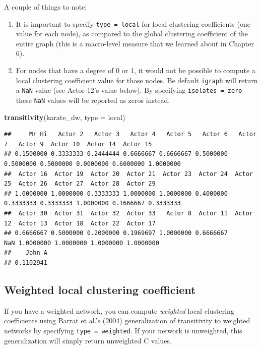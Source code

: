 \documentclass[
]{book}
\newenvironment{Shaded}{\begin{snugshade}}{\end{snugshade}}
\newcommand{\AttributeTok}[1]{\textcolor[rgb]{0.13,0.29,0.53}{#1}}
\newcommand{\FunctionTok}[1]{\textcolor[rgb]{0.13,0.29,0.53}{\textbf{#1}}}
\newcommand{\NormalTok}[1]{#1}
\newcommand{\StringTok}[1]{\textcolor[rgb]{0.31,0.60,0.02}{#1}}
\begin{document}
A couple of things to note:

\begin{enumerate}
\def\labelenumi{\arabic{enumi}.}
\item
  It is important to specify \texttt{type\ =\ local} for local clustering coefficients (one value for each node), as compared to the global clustering coefficient of the entire graph (this is a macro-level measure that we learned about in Chapter 6).
\item
  For nodes that have a degree of 0 or 1, it would not be possible to compute a local clustering coefficient value for those nodes. Be default \texttt{igraph} will return a \texttt{NaN} value (see Actor 12's value below). By specifying \texttt{isolates\ =\ \textquotesingle{}zero\textquotesingle{}} these \texttt{NaN} values will be reported as zeros instead.
\end{enumerate}

\begin{Shaded}
\begin{Highlighting}[]
\FunctionTok{transitivity}\NormalTok{(karate\_dw, }\AttributeTok{type =} \StringTok{\textquotesingle{}local\textquotesingle{}}\NormalTok{)}
\end{Highlighting}
\end{Shaded}

\begin{verbatim}
##     Mr Hi   Actor 2   Actor 3   Actor 4   Actor 5   Actor 6   Actor 7   Actor 9  Actor 10  Actor 14  Actor 15 
## 0.1500000 0.3333333 0.2444444 0.6666667 0.6666667 0.5000000 0.5000000 0.5000000 0.0000000 0.6000000 1.0000000 
##  Actor 16  Actor 19  Actor 20  Actor 21  Actor 23  Actor 24  Actor 25  Actor 26  Actor 27  Actor 28  Actor 29 
## 1.0000000 1.0000000 0.3333333 1.0000000 1.0000000 0.4000000 0.3333333 0.3333333 1.0000000 0.1666667 0.3333333 
##  Actor 30  Actor 31  Actor 32  Actor 33   Actor 8  Actor 11  Actor 12  Actor 13  Actor 18  Actor 22  Actor 17 
## 0.6666667 0.5000000 0.2000000 0.1969697 1.0000000 0.6666667       NaN 1.0000000 1.0000000 1.0000000 1.0000000 
##    John A 
## 0.1102941
\end{verbatim}

\subsection{Weighted local clustering coefficient}\label{weighted-local-clustering-coefficient}

If you have a weighted network, you can compute \emph{weighted} local clustering coefficients using Barrat et al.'s (2004) generalization of transitivity to weighted networks by specifying \texttt{type\ =\ \textquotesingle{}weighted\textquotesingle{}}. If your network is unweighted, this generalization will simply return unweighted C values.
\end{document}
